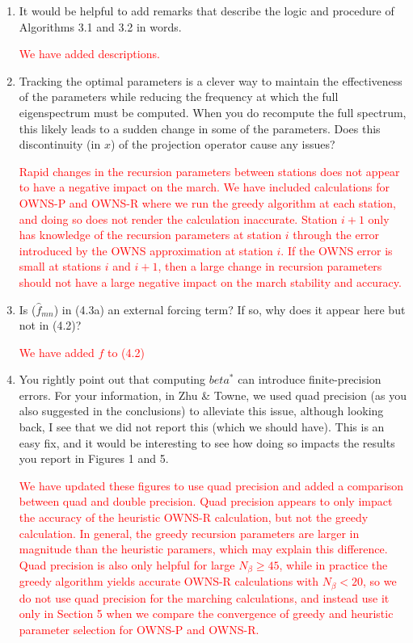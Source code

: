 \documentclass{article}
\newcommand{\response}[1]{\textcolor{red}{#1}}
\begin{document}
\begin{enumerate}
    \item It would be helpful to add remarks that describe the logic and procedure of Algorithms 3.1 and 3.2 in words.

    \response{We have added descriptions.}
    
    \item Tracking the optimal parameters is a clever way to maintain the effectiveness of the parameters while reducing the frequency at which the full eigenspectrum must be computed. When you do recompute the full spectrum, this likely leads to a sudden change in some of the parameters. Does this discontinuity (in $x$) of the projection operator cause any issues?

    \response{Rapid changes in the recursion parameters between stations does not appear to have a negative impact on the march. We have included calculations for OWNS-P and OWNS-R where we run the greedy algorithm at each station, and doing so does not render the calculation inaccurate. Station $i+1$ only has knowledge of the recursion parameters at station $i$ through the error introduced by the OWNS approximation at station $i$. If the OWNS error is small at stations $i$ and $i+1$, then a large change in recursion parameters should not have a large negative impact on the march stability and accuracy.}
    
    \item Is ($\hat{f}_{mn}$) in (4.3a) an external forcing term? If so, why does it appear here but not in (4.2)?

    \response{We have added $f$ to (4.2)}
    
    \item You rightly point out that computing $beta^*$ can introduce finite-precision errors. For your information, in Zhu \& Towne, we used quad precision (as you also suggested in the conclusions) to alleviate this issue, although looking back, I see that we did not report this (which we should have). This is an easy fix, and it would be interesting to see how doing so impacts the results you report in Figures 1 and 5.

    \response{We have updated these figures to use quad precision and added a comparison between quad and double precision. Quad precision appears to only impact the accuracy of the heuristic OWNS-R calculation, but not the greedy calculation. In general, the greedy recursion parameters are larger in magnitude than the heuristic paramers, which may explain this difference. Quad precision is also only helpful for large $N_\beta\geq45$, while in practice the greedy algorithm yields accurate OWNS-R calculations with $N_\beta<20$, so we do not use quad precision for the marching calculations, and instead use it only in Section 5 when we compare the convergence of greedy and heuristic parameter selection for OWNS-P and OWNS-R.}


\end{enumerate}
\end{document}
